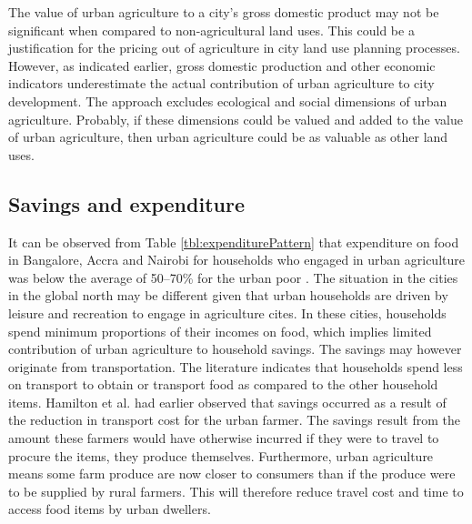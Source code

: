 The value of urban agriculture to a city's gross domestic product may not be significant when compared to non-agricultural land uses. This could be a justification for the pricing out of agriculture in city land use planning processes. However, as indicated earlier, gross domestic production and other economic indicators underestimate the actual contribution of urban agriculture to city development. The approach excludes ecological and social dimensions of urban agriculture. Probably, if these dimensions could be valued and added to the value of urban agriculture, then urban agriculture could be as valuable as other land uses.

\subsection{Savings and expenditure}

It can be observed from Table \ref{tbl:expenditurePattern} that expenditure on food in Bangalore, Accra and Nairobi for households who engaged in urban agriculture was below the average of 50–70\% for the urban poor \cite{FAO2003}. The situation in the cities in the global north may be different given that urban households are driven by leisure and recreation to engage in agriculture cites. In these cities, households spend minimum proportions of their incomes on food, which implies limited contribution of urban agriculture to household savings. The savings may however originate from transportation. The literature indicates that households spend less on transport to obtain or transport food as compared to the other household items. Hamilton et al. \cite{Hamilton2014} had earlier observed that savings occurred as a result of the reduction in transport cost for the urban farmer. The savings result from the amount these farmers would have otherwise incurred if they were to travel to procure the items, they produce themselves. Furthermore, urban agriculture means some farm produce are now closer to consumers than if the produce were to be supplied by rural farmers. This will therefore reduce travel cost and time to access food items by urban dwellers.


